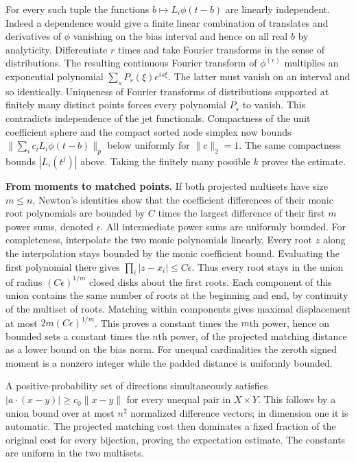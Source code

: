 \documentclass[10pt]{article}
\begin{document}
For every such tuple the functions $b\mapsto L_i\phi(t-b)$ are linearly independent. Indeed a dependence would give a finite linear combination of translates and derivatives of $\phi$ vanishing on the bias interval and hence on all real $b$ by analyticity. Differentiate $r$ times and take Fourier transforms in the sense of distributions. The resulting continuous Fourier transform of $\phi^{(r)}$ multiplies an exponential polynomial $\sum_s P_s(\xi)e^{is\xi}$. The latter must vanish on an interval and so identically. Uniqueness of Fourier transforms of distributions supported at finitely many distinct points forces every polynomial $P_s$ to vanish. This contradicts independence of the jet functionals. Compactness of the unit coefficient sphere and the compact sorted node simplex now bounds $\|\sum_i c_i L_i\phi(t-b)\|_p$ below uniformly for $\|c\|_2=1$. The same compactness bounds $|L_i(t^j)|$ above. Taking the finitely many possible $k$ proves the estimate.

\textbf{From moments to matched points.} If both projected multisets have size $m\le n$, Newton's identities show that the coefficient differences of their monic root polynomials are bounded by $C$ times the largest difference of their first $m$ power sums, denoted $\epsilon$. All intermediate power sums are uniformly bounded. For completeness, interpolate the two monic polynomials linearly. Every root $z$ along the interpolation stays bounded by the monic coefficient bound. Evaluating the first polynomial there gives $\prod_i|z-x_i|\le C\epsilon$. Thus every root stays in the union of radius $(C\epsilon)^{1/m}$ closed disks about the first roots. Each component of this union contains the same number of roots at the beginning and end, by continuity of the multiset of roots. Matching within components gives maximal displacement at most $2m(C\epsilon)^{1/m}$. This proves a constant times the $m$th power, hence on bounded sets a constant times the $n$th power, of the projected matching distance as a lower bound on the bias norm. For unequal cardinalities the zeroth signed moment is a nonzero integer while the padded distance is uniformly bounded.

A positive-probability set of directions simultaneously satisfies $|a\cdot(x-y)|\ge c_0\|x-y\|$ for every unequal pair in $X\times Y$. This follows by a union bound over at most $n^2$ normalized difference vectors; in dimension one it is automatic. The projected matching cost then dominates a fixed fraction of the original cost for every bijection, proving the expectation estimate. The constants are uniform in the two multisets.
\end{document}
